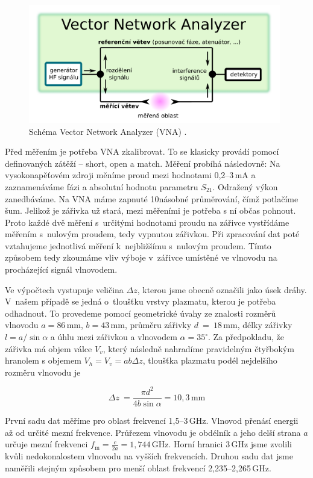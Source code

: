 \documentclass[a4paper,12pt]{article}
\begin{document}
\begin{figure}[h]
	\centering
	\includegraphics[width=110mm]{vna.png}
	\caption{Schéma Vector Network Analyzer (VNA) \cite{navod}.}
	\label{vna}
\end{figure}

Před měřením je potřeba VNA zkalibrovat. To se klasicky provádí pomocí definovaných
zátěží -- short, open a match. Měření probíhá následovně: Na vysokonapěťovém zdroji
měníme proud mezi hodnotami 0,2--3\,\si{\milli\ampere} a zaznamenáváme fázi a 
absolutní hodnotu parametru $S_{21}$. Odražený výkon zanedbáváme. Na VNA máme 
zapnuté 10násobné průměrování, 
čímž 
potlačíme
šum. Jelikož je zářivka už stará, mezi měřeními je potřeba s ní občas pohnout. 
Proto každé dvě měření s~určitými hodnotami proudu na zářivce vystřídáme měřením
s~nulovým proudem, tedy vypnutou zářivkou. Při zpracování dat poté vztahujeme jednotlivá
měření k~nejbližšímu s~nulovým proudem. Tímto způsobem tedy zkoumáme vliv výboje v~zářivce umístěné ve vlnovodu na procházející signál vlnovodem.

Ve výpočtech vystupuje veličina $\Delta z$, kterou jsme obecně označili jako 
úsek dráhy.
V~našem případě se jedná o~tloušťku vrstvy plazmatu, kterou je potřeba 
odhadnout. To provedeme
pomocí geometrické úvahy ze znalosti rozměrů vlnovodu $a = 
86$\,\si{\milli\meter}, $b = 
43$\,\si{\milli\meter},
průměru zářivky $d$~=~$18$\,\si{\milli\meter}, délky zářivky $l = 
a/\!\sin\alpha$ 
a úhlu mezi 
zářivkou a vlnovodem 
$\alpha = 35^{\circ}$. Za
předpokladu, že zářivka má objem válce $V_v$, který následně nahradíme 
pravidelným
čtyř\-bo\-kým hranolem s objemem $V_h = V_v =ab\Delta z$, tloušťka plazmatu 
podél 
nejdelšího rozměru vlnovodu je

\begin{equation}
	\Delta z~= \frac{\pi d^2}{4b\sin\alpha} = 10,3\,\si{\milli\meter}
\end{equation}

První sadu dat měříme pro oblast frekvencí 1,5--3\,\si{\giga\hertz}. 
Vlnovod přenásí energii až od určité mezní frekvence. Průřezem vlnovodu je 
obdélník a jeho delší strana $a$ určuje mezní frekvenci $f_{\text{m}} = 
\frac{c}{2a} = 1,744\,\si{\giga\hertz}$. Horní hranici 3\,\si{\giga\hertz} jsme 
zvolili kvůli nedokonalostem vlnovodu na vyšších frekvencích. Druhou sadu dat 
jsme naměřili stejným způsobem pro menší oblast frekvencí 
2,235--2,265\,\si{\giga\hertz}.
\end{document}
